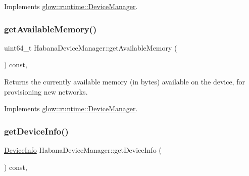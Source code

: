 Implements \hyperlink{classglow_1_1runtime_1_1_device_manager_a147c76a007db17659c1962c1fa864f9a}{glow\+::runtime\+::\+Device\+Manager}.

\mbox{\label{classglow_1_1runtime_1_1_habana_device_manager_a9b23cdaa74210f057dd3bb6f839e0509}} 
\subsubsection{\texorpdfstring{get\+Available\+Memory()}{getAvailableMemory()}}
{\footnotesize\ttfamily uint64\+\_\+t Habana\+Device\+Manager\+::get\+Available\+Memory (\begin{DoxyParamCaption}{ }\end{DoxyParamCaption}) const\hspace{0.3cm}{\ttfamily [override]}, {\ttfamily [virtual]}}

\begin{DoxyReturn}{Returns}
the currently available memory (in bytes) available on the device, for provisioning new networks. 
\end{DoxyReturn}


Implements \hyperlink{classglow_1_1runtime_1_1_device_manager_a5a84ac3b23b9b6d72f50d763913ed8aa}{glow\+::runtime\+::\+Device\+Manager}.

\mbox{\label{classglow_1_1runtime_1_1_habana_device_manager_a5c73935d669a16b259c37b335caae76d}} 
\subsubsection{\texorpdfstring{get\+Device\+Info()}{getDeviceInfo()}}
{\footnotesize\ttfamily \hyperlink{structglow_1_1runtime_1_1_device_info}{Device\+Info} Habana\+Device\+Manager\+::get\+Device\+Info (\begin{DoxyParamCaption}{ }\end{DoxyParamCaption}) const\hspace{0.3cm}{\ttfamily [override]}, {\ttfamily [virtual]}}

